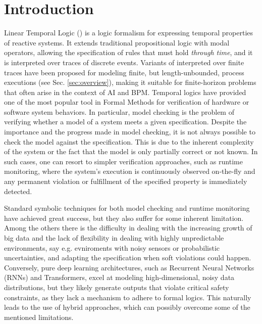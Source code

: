 \section{Introduction}
\label{sec:intro}


Linear Temporal Logic (\ltl) \cite{LTL} is a logic formalism for expressing temporal properties of reactive systems. It extends traditional propositional logic with modal operators, allowing the specification of rules that must hold \emph{through time}, and it is interpreted over traces of discrete events. Variants of \ltl interpreted
over finite traces have been proposed for modeling finite, but length-unbounded, process executions (see Sec. \ref{sec:overview}), making it suitable for finite-horizon problems that often arise in the context of AI and BPM.
Temporal logics have provided one of the most popular tool in Formal Methods for verification of hardware or software system behaviors. In particular, model checking is the problem of verifying whether a model of a system meets a given specification. Despite the importance and the progress made in model checking, it is not always possible to check the model against the specification. This is due to the inherent complexity of the system or the fact that the model is only partially correct or not known. In such cases, one can resort to simpler verification approaches, such as runtime monitoring, where the system's execution is continuously observed on-the-fly and any permanent violation or fulfillment of the specified property is immediately detected. 

Standard symbolic techniques for both model checking and runtime monitoring have achieved great success, but they also suffer for some inherent limitation. Among the others there is the difficulty in dealing with the increasing growth of big data and the lack of flexibility in dealing with highly unpredictable environments, say e.g. evniroments with noisy sensors or probabilistic uncertainties, and adapting the specification when soft violations could happen. Conversely, pure deep learning architectures, such as Recurrent Neural Networks (RNNs) and Transformers, excel at modeling high-dimensional, noisy data distributions, but they likely generate outputs that violate critical safety constraints, as they lack a mechanism to adhere to formal logics. This naturally leads to the use of hybrid approaches, which can possibly overcome some of the mentioned limitations. 

